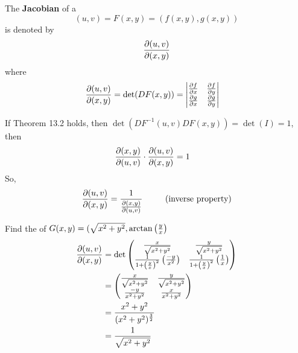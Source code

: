 \documentclass[english, 11pt]{article}
\begin{document}
\begin{defn}[Jacobian]\label{Jacobian}
The \textbf{Jacobian} of a 
\[ (u,v) = F(x,y) = (f(x,y), g(x,y)) \]
is denoted by
\[ \frac{\partial(u,v)}{\partial (x,y)} \]
where
\begin{align*}
  \frac{\partial(u,v)}{\partial(x,y)} & = \det(DF(x,y)) = \left| \begin{matrix} \frac{\partial f}{\partial x} & \frac{\partial f}{\partial y} \\ \frac{\partial g}{\partial x} & \frac{\partial g}{\partial y} \end{matrix} \right|
\end{align*}
\begin{note}
  If Theorem 13.2 holds, then $\det(DF^{-1}(u,v)DF(x,y)) = \det(I) = 1$, then
  \begin{align*}
    \frac{\partial(x,y)}{\partial(u,v)} \cdot \frac{\partial(u,v)}{\partial(x,y)} & = 1
  \end{align*}
  So,
  \[ \frac{\partial(u,v)}{\partial(x,y)} = \frac{1}{\frac{\partial(x,y)}{\partial(u,v)}} \ \ \ \ \ \ \ \ \mbox{(inverse property)} \]
\end{note}
\end{defn}

\begin{exmp}
  Find the  of $G(x,y) = (\sqrt{x^2 + y^2}, \arctan \left( \frac{y}{x} \right)$ \\

  \begin{align*}
    \frac{\partial(u,v)}{\partial(x,y)} & = \det \left( \begin{matrix} \frac{x}{\sqrt{x^2 + y^2}} & \frac{y}{\sqrt{x^2 + y^2}} \\
                        \frac{1}{1 + \left( \frac{y}{x} \right)^2}\left( \frac{-y}{x^2} \right) & 
                        \frac{1}{1 + \left( \frac{y}{x} \right)^2}\left( \frac{1}{x} \right) \end{matrix} \right) \\
         & = \left( \begin{matrix} \frac{x}{\sqrt{x^2 + y^2}} & \frac{y}{\sqrt{x^2 + y^2}} \\
                        \frac{-y}{x^2 + y^2} & 
                        \frac{x}{x^2 + y^2} \end{matrix} \right) \\
        & = \frac{x^2 + y^2}{(x^2 +y^2)^{\frac{3}{2}}} \\
        & = \frac{1}{\sqrt{x^2 + y^2}}
  \end{align*}
\end{exmp}
\end{document}
